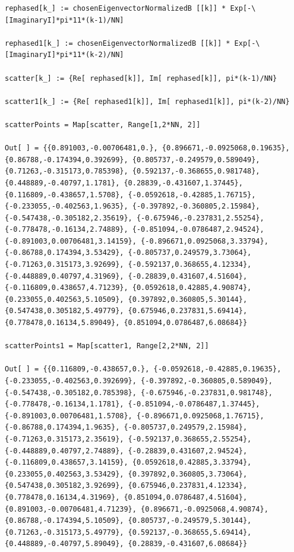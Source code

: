 \begin{Verbatim}
rephased[k_] := chosenEigenvectorNormalizedB [[k]] * Exp[-\[ImaginaryI]*pi*11*(k-1)/NN]

rephased1[k_] := chosenEigenvectorNormalizedB [[k]] * Exp[-\[ImaginaryI]*pi*11*(k-2)/NN]

scatter[k_] := {Re[ rephased[k]], Im[ rephased[k]], pi*(k-1)/NN}

scatter1[k_] := {Re[ rephased1[k]], Im[ rephased1[k]], pi*(k-2)/NN}

scatterPoints = Map[scatter, Range[1,2*NN, 2]]

Out[ ] = {{0.891003,-0.00706481,0.}, {0.896671,-0.0925068,0.19635}, {0.86788,-0.174394,0.392699}, {0.805737,-0.249579,0.589049}, {0.71263,-0.315173,0.785398}, {0.592137,-0.368655,0.981748}, {0.448889,-0.40797,1.1781}, {0.28839,-0.431607,1.37445}, {0.116809,-0.438657,1.5708}, {-0.0592618,-0.42885,1.76715}, {-0.233055,-0.402563,1.9635}, {-0.397892,-0.360805,2.15984}, {-0.547438,-0.305182,2.35619}, {-0.675946,-0.237831,2.55254}, {-0.778478,-0.16134,2.74889}, {-0.851094,-0.0786487,2.94524}, {-0.891003,0.00706481,3.14159}, {-0.896671,0.0925068,3.33794}, {-0.86788,0.174394,3.53429}, {-0.805737,0.249579,3.73064}, {-0.71263,0.315173,3.92699}, {-0.592137,0.368655,4.12334}, {-0.448889,0.40797,4.31969}, {-0.28839,0.431607,4.51604}, {-0.116809,0.438657,4.71239}, {0.0592618,0.42885,4.90874}, {0.233055,0.402563,5.10509}, {0.397892,0.360805,5.30144}, {0.547438,0.305182,5.49779}, {0.675946,0.237831,5.69414}, {0.778478,0.16134,5.89049}, {0.851094,0.0786487,6.08684}}

scatterPoints1 = Map[scatter1, Range[2,2*NN, 2]]

Out[ ] = {{0.116809,-0.438657,0.}, {-0.0592618,-0.42885,0.19635}, {-0.233055,-0.402563,0.392699}, {-0.397892,-0.360805,0.589049}, {-0.547438,-0.305182,0.785398}, {-0.675946,-0.237831,0.981748}, {-0.778478,-0.16134,1.1781}, {-0.851094,-0.0786487,1.37445}, {-0.891003,0.00706481,1.5708}, {-0.896671,0.0925068,1.76715}, {-0.86788,0.174394,1.9635}, {-0.805737,0.249579,2.15984}, {-0.71263,0.315173,2.35619}, {-0.592137,0.368655,2.55254}, {-0.448889,0.40797,2.74889}, {-0.28839,0.431607,2.94524}, {-0.116809,0.438657,3.14159}, {0.0592618,0.42885,3.33794}, {0.233055,0.402563,3.53429}, {0.397892,0.360805,3.73064}, {0.547438,0.305182,3.92699}, {0.675946,0.237831,4.12334}, {0.778478,0.16134,4.31969}, {0.851094,0.0786487,4.51604}, {0.891003,-0.00706481,4.71239}, {0.896671,-0.0925068,4.90874}, {0.86788,-0.174394,5.10509}, {0.805737,-0.249579,5.30144}, {0.71263,-0.315173,5.49779}, {0.592137,-0.368655,5.69414}, {0.448889,-0.40797,5.89049}, {0.28839,-0.431607,6.08684}}
\end{Verbatim}

